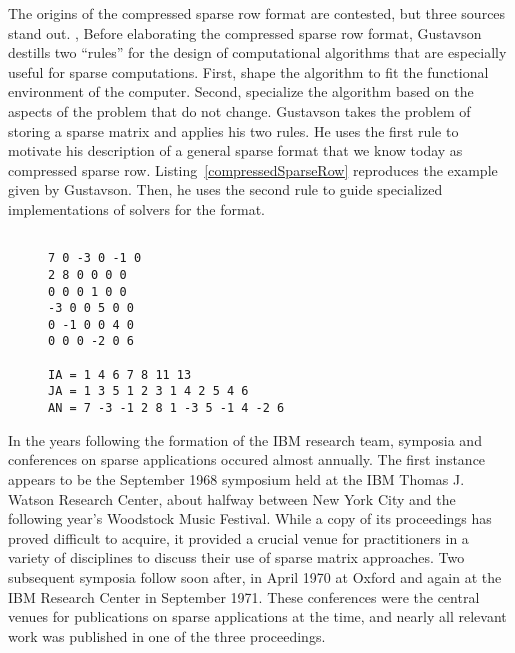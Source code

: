 The origins of the compressed sparse row format are contested, but three sources stand out. 
, 
Before elaborating the compressed sparse row format, Gustavson~\cite{gustavson1972some} destills two \enquote{rules} for the design of computational algorithms that are especially useful for sparse computations. 
First, shape the algorithm to fit the functional environment of the computer. 
Second, specialize the algorithm based on the aspects of the problem that do not change.
Gustavson takes the problem of storing a sparse matrix and applies his two rules. 
He uses the first rule to motivate his description of a general sparse format that we know today as compressed sparse row. 
Listing~\ref{compressedSparseRow} reproduces the example given by Gustavson.
Then, he uses the second rule to guide specialized implementations of solvers for the format. 
\begin{figure}
\begin{lstlisting}[caption={Example of compressed sparse row storage given by~\cite{gustavson1972some}},label=compressedSparseRow]

7 0 -3 0 -1 0
2 8 0 0 0 0
0 0 0 1 0 0 
-3 0 0 5 0 0
0 -1 0 0 4 0 
0 0 0 -2 0 6

IA = 1 4 6 7 8 11 13
JA = 1 3 5 1 2 3 1 4 2 5 4 6
AN = 7 -3 -1 2 8 1 -3 5 -1 4 -2 6
\end{lstlisting}
\end{figure}


In the years following the formation of the IBM research team, symposia and conferences on sparse applications occured almost annually. 
The first instance appears to be the September 1968 symposium held at the IBM Thomas J. Watson Research Center, about halfway between New York City and the following year's Woodstock Music Festival. 
While a copy of its proceedings has proved difficult to acquire, it provided a crucial venue for practitioners in a variety of disciplines to discuss their use of sparse matrix approaches.
Two subsequent symposia follow soon after, in April 1970 at Oxford and again at the IBM Research Center in September 1971.
These conferences were the central venues for publications on sparse applications at the time, and nearly all relevant work was published in one of the three proceedings.

